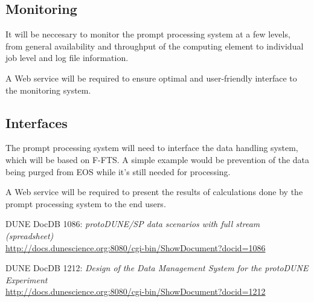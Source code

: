 \documentclass[pdftex,12pt,letter]{article}
\begin{document}
\subsection{Monitoring}
It will be neccesary to monitor the prompt processing system at a few levels, from general availability and throughput of the computing element
to individual job level and log file information.

A Web service will be required to ensure optimal and user-friendly interface to the monitoring system.

\subsection{Interfaces}
The prompt processing system will need to interface the data handling system, which will be based on F-FTS. A simple example
would be prevention of the data being purged from EOS while it's still needed for processing.

A Web service will be required to present the results of calculations done by the prompt processing system to the end users.

\begin{thebibliography}{1}
{DUNE DocDB 1086: \textit{ protoDUNE/SP data scenarios with full stream (spreadsheet)}}\\
\url{http://docs.dunescience.org:8080/cgi-bin/ShowDocument?docid=1086}





{DUNE DocDB 1212: \textit{Design of the Data Management System for the protoDUNE Experiment}}\\
\url{http://docs.dunescience.org:8080/cgi-bin/ShowDocument?docid=1212}


\end{thebibliography}
\end{document}
